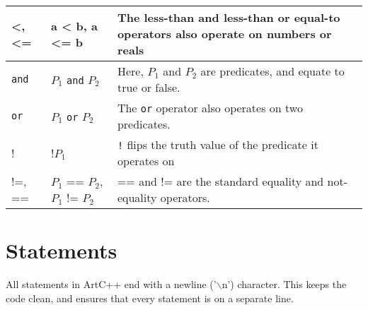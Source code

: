 \documentclass[a4paper, 11pt]{article}
\begin{document}
\begin{tabular}{ |p{3cm}|p{5cm}|p{7cm}|  }
  <, <= & a < b, a <= b & The less-than and less-than or equal-to operators also operate on numbers or reals\\ \hline
  \texttt{and} & $P_1$ \texttt{and} $P_2$ & Here, $P_1$ and $P_2$ are predicates, and equate to true or false.\\ \hline
  \texttt{or} &  $P_1$ \texttt{or} $P_2$ & The \texttt{or} operator also operates on two predicates.\\ \hline
  ! & !$P_1$ & \texttt{!} flips the truth value of the predicate it operates on \\ \hline
  !=, == & $P_1$ == $P_2$, $P_1$ != $P_2$ & == and != are the standard equality and not-equality operators.\\
  \hline
 \end{tabular}




\section{Statements}
    All statements in ArtC++ end with a newline ('$\backslash$n') character. This keeps the code clean, and ensures that every statement is on a separate line.
\end{document}

